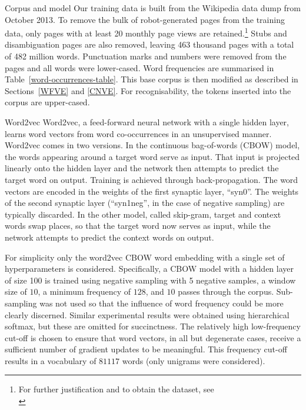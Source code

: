 \documentclass{article} %
\begin{document}
\begin{section}{Corpus and model}\label{corpus-and-model}
Our training data is built from the Wikipedia data dump from October
2013.  To remove the bulk of robot-generated pages from the training
data, only pages with at least 20 monthly page views are
retained.\footnote{For further justification and to obtain the dataset,
  see\\ \blogpost} Stubs and disambiguation pages are also removed,
leaving 463 thousand pages with a total of 482 million words.
Punctuation marks and numbers were removed from the pages and all words
were lower-cased.  Word frequencies are summarised in
Table~\ref{word-occurrences-table}.  This base corpus is then modified
as described in Sections~\ref{WFVE} and \ref{CNVE}.  For
recognisability, the tokens inserted into the corpus are upper-cased.

\begin{subsection}{Word2vec}\label{word2vec}
Word2vec, a feed-forward neural network with a single hidden layer,
learns word vectors from word co-occurrences in an unsupervised manner.
Word2vec comes in two versions.  In the continuous bag-of-words (CBOW)
model, the words appearing around a target word serve as input.  That
input is projected linearly onto the hidden layer and the network then
attempts to predict the target word on output.  Training is achieved
through back-propagation.  The word vectors are encoded in the weights
of the first synaptic layer, ``syn0''.  The weights of the second
synaptic layer (``syn1neg'', in the case of negative sampling) are
typically discarded.  In the other model, called skip-gram, target and
context words swap places, so that the target word now serves as input,
while the network attempts to predict the context words on output.

For simplicity only the word2vec CBOW word embedding with a single set
of hyperparameters is considered.  Specifically, a CBOW model with a
hidden layer of size 100 is trained using negative sampling with 5
negative samples, a window size of $10$, a minimum frequency of
$128$, and $10$ passes through the corpus.  Sub-sampling was not used so
that the influence of word frequency could be more clearly discerned.
Similar experimental results were obtained using hierarchical softmax,
but these are omitted for succinctness.  The relatively high
low-frequency cut-off is chosen to ensure that word vectors, in all but
degenerate cases, receive a sufficient number of gradient updates to be
meaningful.  This frequency cut-off results in a vocabulary of $81117$
words (only unigrams were considered).


\end{subsection}
\end{section}
\end{document}
